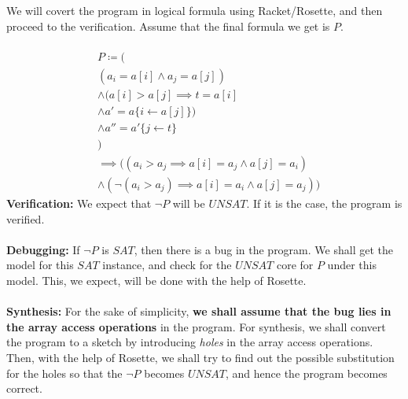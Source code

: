 \documentclass[a4paper, 12pt, notitlepage] {article}
\begin{document}
We will covert the program in logical formula using Racket/Rosette, and then proceed to the verification. Assume that the final formula we get is $P$.\\
\\
\begin{equation}
\begin{split}
  &P \coloneqq (\\
  &(a_i = a[i] \land a_j = a[j]) \\
&\land (a[i] > a[j] \implies t = a[i]\\
& \land a' = a\{i \leftarrow a[j]\})  \\
& \land a'' = a'\{j \leftarrow t\}\\
&) \\
&\implies ((a_i > a_j \implies a[i] = a_j \land a[j] = a_i)\\
&\land (\neg (a_i > a_j) \implies a[i] = a_i \land a[j] = a_j))
\end{split}
\end{equation}
{\bf Verification:} We expect that $\neg P$ will be $UNSAT$. If it is the case, the program is verified.
\\\\
{\bf Debugging:} If $\neg P$ is $SAT$, then there is a bug in the program. We shall get the model for this $SAT$ instance, and check for the $UNSAT$ core for $P$ under this model. This, we expect, will be done with the help of Rosette. \\
\\
{\bf Synthesis:} For the sake of simplicity, {\bf we shall assume that the bug lies in the array access operations} in the program. For synthesis, we shall convert the program to a sketch by introducing \emph{holes} in the array access operations. Then, with the help of Rosette, we shall try to find out the possible substitution for the holes so that the $\neg P$ becomes $UNSAT$, and hence the program becomes correct. \\
\\
\end{document}
